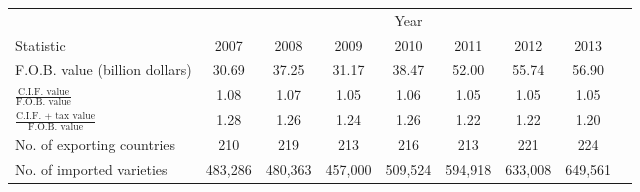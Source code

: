 \begin{adjustwidth}{0in}{0in}
\begin{tabular}{lcccccccc}
\toprule
 &                 \multicolumn{7}{c}{Year}  \\
Statistic    & 2007  &    2008   & 2009    &   2010     &  2011 &     2012   &    2013  \\ 
\midrule
\footnotesize{F.O.B. value} \scriptsize{(billion dollars)} &30.69&37.25&31.17&38.47&52.00&55.74&56.90\\
\addlinespace
$\frac{\text{C.I.F. value}}{\text{F.O.B. value}}$  &1.08&1.07&1.05&1.06&1.05&1.05&1.05\\
\addlinespace
$\frac{\text{C.I.F. + tax value}}{\text{F.O.B. value}}$   &1.28&1.26&1.24&1.26&1.22&1.22&1.20\\
\addlinespace
\footnotesize{No. of exporting countries}  &      210&      219&      213&      216&      213&      221&      224\\
\addlinespace
\footnotesize{No. of imported varieties}    &  483,286&  480,363&  457,000&  509,524&  594,918&  633,008&  649,561\\
\bottomrule \end{tabular}
\end{adjustwidth}